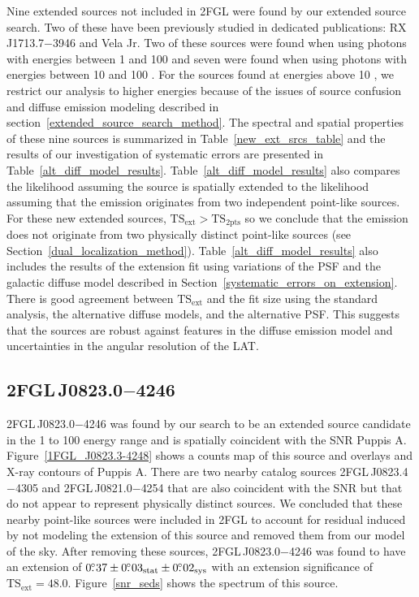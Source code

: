 \documentclass[12pt,preprint]{aastex}
\newcommand{\gev}{\text{GeV}\xspace}
\newcommand{\tsext}{{\ensuremath{\text{TS}_{\text{ext}}}}\xspace}
\newcommand{\tsinc}{\ensuremath{\text{TS}_{\text{2pts}}}\xspace}
\newcommand{\rosat}{\text{{\em ROSAT}}\xspace}
\newcommand{\sys}{\text{sys}\xspace}
\newcommand{\stat}{\text{stat}\xspace}
\begin{document}
Nine extended sources not included in 2FGL were found by our
extended source search. Two of these have been previously
studied in dedicated publications: RX\,J1713.7$-$3946 and Vela
Jr. \citep{rx_j1713_lat,vela_jr_lat}
Two of these sources were
found when using photons with energies between 1 \gev and 100 \gev and seven
were found when using photons with energies between 10 \gev and 100 \gev.
For the sources found at energies above 10 \gev, we restrict our
analysis to higher energies because of the issues
of source confusion and diffuse emission modeling described in
section~\ref{extended_source_search_method}.
The spectral and spatial properties of these nine sources is summarized
in Table~\ref{new_ext_srcs_table} and the results of our investigation of
systematic errors are presented in Table~\ref{alt_diff_model_results}.
Table~\ref{alt_diff_model_results}
also
compares the likelihood assuming the source is spatially
extended to the likelihood assuming 
that the emission originates from two independent point-like
sources. For these new extended sources, $\tsext>\tsinc$ 
so we conclude that 
the \gev emission does not originate from two physically
distinct point-like sources (see Section~\ref{dual_localization_method}).  
Table~\ref{alt_diff_model_results} also includes the
results of the extension fit using variations of the PSF and the galactic
diffuse model described in Section~\ref{systematic_errors_on_extension}.
There is good agreement between \tsext and the fit size using the standard
analysis, the alternative diffuse models, and the alternative PSF.
This suggests that the sources are robust against features in the diffuse
emission model and uncertainties in the angular resolution of the LAT.

\subsection{2FGL\,J0823.0$-$4246}
\label{section_2FGL_J0823.0-4246}


2FGL\,J0823.0$-$4246 was found by our search to be an extended source
candidate in the 1 \gev to 100 \gev energy range and is spatially
coincident with the SNR Puppis A.  Figure~\ref{1FGL_J0823.3-4248} shows
a counts map of this source and overlays and \rosat X-ray contours of
Puppis A.  There are two nearby catalog sources 2FGL\,J0823.4$-$4305
and 2FGL\,J0821.0$-$4254 that are also coincident with the SNR but that
do not appear to represent physically distinct sources.
We concluded that
these nearby point-like sources
were included in 2FGL to account for residual induced
by not modeling the extension of this source and
removed them from our model of the sky.
After removing these sources, 2FGL\,J0823.0$-$4246 was found to have an extension of
$0\fdg37\pm0\fdg03_\stat\pm0\fdg02_\sys$ with an extension significance
of $\tsext=48.0$.  Figure~\ref{snr_seds} shows the spectrum of
this source.
\end{document}
